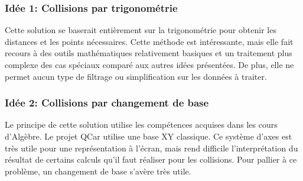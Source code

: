 \documentclass[a4paper, 12pt]{article}
\begin{document}
\subsubsection{Idée 1: Collisions par trigonométrie}
Cette solution se baserait entièrement sur la trigonométrie pour obtenir les distances et les points nécessaires. Cette méthode est intéressante, mais elle fait recours à des outils mathématiques relativement basiques et un traitement plus complexe des cas spéciaux comparé aux autres idées présentées. De plus, elle ne permet aucun type de filtrage ou simplification sur les données à traiter.
\subsubsection{Idée 2: Collisions par changement de base}
Le principe de cette solution utilise les compétences acquises dans les cours d'Algèbre. Le projet QCar utilise une base XY classique. Ce système d'axes est très utile pour une représentation à l'écran, mais rend difficile l'interprétation du résultat de certains calculs qu'il faut réaliser pour les collisions. Pour pallier à ce problème, un changement de base s'avère très utile.
\end{document}
